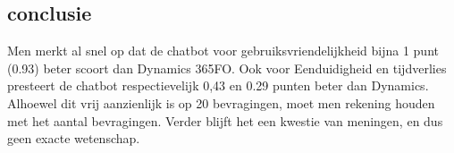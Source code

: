 \subsection{conclusie}
Men merkt al snel op dat de chatbot voor gebruiksvriendelijkheid bijna 1 punt (0.93) beter scoort dan Dynamics 365FO. Ook voor Eenduidigheid en tijdverlies presteert de chatbot respectievelijk 0,43 en 0.29 punten beter dan Dynamics. Alhoewel dit vrij aanzienlijk is op 20 bevragingen, moet men rekening houden met het aantal bevragingen. Verder blijft het een kwestie van meningen, en dus geen exacte wetenschap. 

